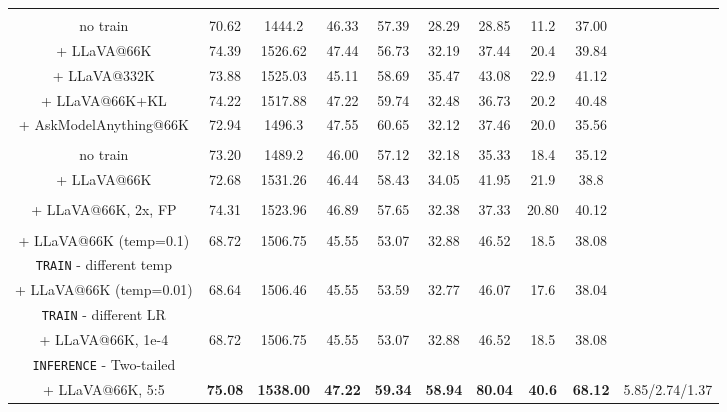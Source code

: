 \documentclass[11pt]{article}
\begin{document}
\begin{table}[ht]
{\begin{tabular}{c|cccc|cccc|c}
        \rowcolor{gray!10}\multicolumn{9}{c}{\textbf{fixed pooling}} \\
        
        no train & 70.62 & 1444.2 & 46.33 & 57.39 & 28.29 & 28.85 & 11.2 & 37.00 \\
        
        \rowcolor{yellow!30}+ LLaVA@66K & 74.39 & 1526.62 & 47.44 & 56.73 & 32.19 & 37.44 & 20.4 & 39.84 \\
        + LLaVA@332K & 73.88 & 1525.03 & 45.11 & 58.69 & 35.47 & 43.08 & 22.9 & 41.12 \\
        + LLaVA@66K+KL & 74.22 & 1517.88 & 47.22 & 59.74 & 32.48 & 36.73 & 20.2 & 40.48 \\
        + AskModelAnything@66K & 72.94 & 1496.3 & 47.55 & 60.65 & 32.12 & 37.46 & 20.0 & 35.56 \\
        \rowcolor{gray!10}\multicolumn{9}{c}{\textbf{random pruning}} \\
        
        no train & 73.20 & 1489.2 & 46.00 & 57.12 & 32.18 & 35.33 & 18.4 & 35.12\\
        \rowcolor{yellow!30}+ LLaVA@66K & 72.68 & 1531.26 & 46.44 & 58.43 & 34.05 & 41.95 & 21.9 & 38.8 \\
        \rowcolor{gray!10}\multicolumn{9}{c}{\textbf{Perceiver}} \\ 
        + LLaVA@66K, 2x, FP & 74.31 & 1523.96 & 46.89 & 57.65 & 32.38 & 37.33 & 20.80 & 40.12 \\
        \rowcolor{gray!10}\multicolumn{9}{c}{\textbf{DRIP/VLVLM}} \\
        + LLaVA@66K (temp=0.1) & 68.72 & 1506.75 & 45.55 & 53.07 & 32.88 & 46.52 & 18.5 & 38.08 \\
        \cellcolor{pink!40}\texttt{TRAIN} - different temp \\

        + LLaVA@66K (temp=0.01) & 68.64 & 1506.46 & 45.55 & 53.59 & 32.77 & 46.07 & 17.6 & 38.04 \\
        \cellcolor{pink!40}\texttt{TRAIN} - different LR \\
        + LLaVA@66K, 1e-4 & 68.72 & 1506.75 & 45.55 & 53.07 & 32.88 & 46.52 & 18.5 & 38.08 \\
        \cellcolor{pink!40}\texttt{INFERENCE} - Two-tailed \\
        \rowcolor{yellow!30}+ LLaVA@66K, 5:5 & \textbf{75.08} & \textbf{1538.00} & \textbf{47.22} & \textbf{59.34} & \textbf{58.94} & \textbf{80.04} & \textbf{40.6} & \textbf{68.12} & 5.85/2.74/1.37 \\


\end{tabular}}
\end{table}
\end{document}
